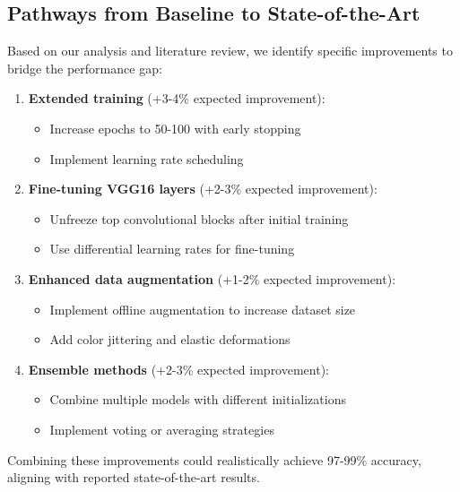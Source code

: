 \documentclass[conference]{IEEEtran}
\begin{document}
\subsection{Pathways from Baseline to State-of-the-Art}

Based on our analysis and literature review, we identify specific improvements to bridge the performance gap:

\begin{enumerate}
    \item \textbf{Extended training} (+3-4\% expected improvement):
    \begin{itemize}
        \item Increase epochs to 50-100 with early stopping
        \item Implement learning rate scheduling
    \end{itemize}
    
    \item \textbf{Fine-tuning VGG16 layers} (+2-3\% expected improvement):
    \begin{itemize}
        \item Unfreeze top convolutional blocks after initial training
        \item Use differential learning rates for fine-tuning
    \end{itemize}
    
    \item \textbf{Enhanced data augmentation} (+1-2\% expected improvement):
    \begin{itemize}
        \item Implement offline augmentation to increase dataset size
        \item Add color jittering and elastic deformations
    \end{itemize}
    
    \item \textbf{Ensemble methods} (+2-3\% expected improvement):
    \begin{itemize}
        \item Combine multiple models with different initializations
        \item Implement voting or averaging strategies
    \end{itemize}
\end{enumerate}

Combining these improvements could realistically achieve 97-99\% accuracy, aligning with reported state-of-the-art results.
\end{document}
